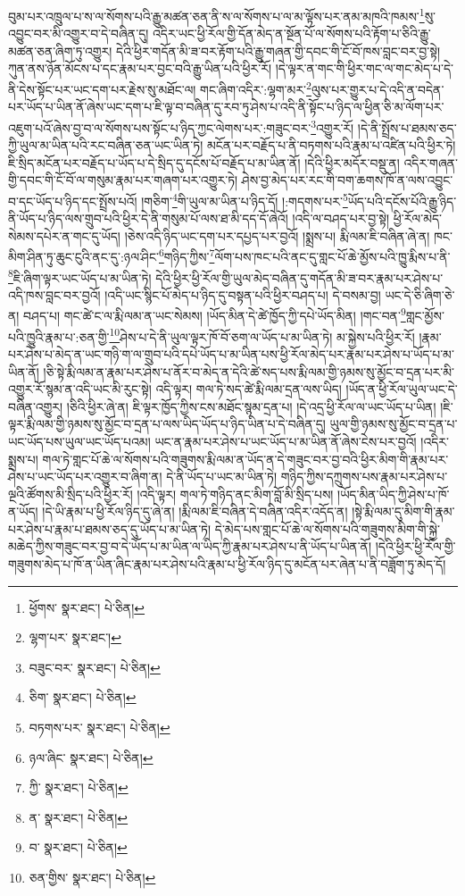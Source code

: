 བུམ་པར་འཁྲུལ་པ་ས་ལ་སོགས་པའི་རྒྱུ་མཚན་ཅན་ནི་ས་ལ་སོགས་པ་ལ་མ་ལྟོས་པར་ནམ་མཁའི་ཁམས་\footnote{ཕྱོགས་  སྣར་ཐང་།  པེ་ཅིན། }སུ་འབྱུང་བར་མི་འགྱུར་བ་དེ་བཞིན་དུ། འདིར་ཡང་ཕྱི་རོལ་གྱི་དོན་མེད་ན་སྔོན་པོ་ལ་སོགས་པའི་རྟོག་པ་ཅིའི་རྒྱུ་མཚན་ཅན་ཞིག་ཏུ་འགྱུར། དེའི་ཕྱིར་གདོན་མི་ཟ་བར་རྟོག་པའི་རྒྱུ་གཞན་གྱི་དབང་གི་ངོ་བོ་ཁས་བླང་བར་བྱ་སྟེ། ཀུན་ནས་ཉོན་མོངས་པ་དང་རྣམ་པར་བྱང་བའི་རྒྱུ་ཡིན་པའི་ཕྱིར་རོ། །དེ་ལྟར་ན་གང་གི་ཕྱིར་གང་ལ་གང་མེད་པ་དེ་ནི་དེས་སྟོང་པར་ཡང་དག་པར་རྗེས་སུ་མཐོང་ལ། གང་ཞིག་འདིར་:ལྷག་མར་\footnote{ལྷག་པར་  སྣར་ཐང་། }ལུས་པར་གྱུར་པ་དེ་འདི་ན་བདེན་པར་ཡོད་པ་ཡིན་ནོ་ཞེས་ཡང་དག་པ་ཇི་ལྟ་བ་བཞིན་དུ་རབ་ཏུ་ཤེས་པ་འདི་ནི་སྟོང་པ་ཉིད་ལ་ཕྱིན་ཅི་མ་ལོག་པར་འཇུག་པའོ་ཞེས་བྱ་བ་ལ་སོགས་པས་སྟོང་པ་ཉིད་ཀྱང་ལེགས་པར་:གཟུང་བར་\footnote{བཟུང་བར་  སྣར་ཐང་།  པེ་ཅིན། }འགྱུར་རོ། །དེ་ནི་སྤྲོས་པ་ཐམས་ཅད་ཀྱི་ཡུལ་མ་ཡིན་པའི་རང་བཞིན་ཅན་ཡང་ཡིན་ཏེ། མངོན་པར་བརྗོད་པ་ནི་བཏགས་པའི་རྣམ་པ་འཛིན་པའི་ཕྱིར་ཏེ། ཇི་སྲིད་མངོན་པར་བརྗོད་པ་ཡོད་པ་དེ་སྲིད་དུ་དངོས་པོ་བརྗོད་པ་མ་ཡིན་ནོ། །དེའི་ཕྱིར་མདོར་བསྡུ་ན། འདིར་གཞན་གྱི་དབང་གི་ངོ་བོ་ལ་གསུམ་རྣམ་པར་གཞག་པར་འགྱུར་ཏེ། ཤེས་བྱ་མེད་པར་རང་གི་བག་ཆགས་ཁོ་ན་ལས་འབྱུང་བ་དང་ཡོད་པ་ཉིད་དང་སྤྲོས་པའོ། །གཅིག་\footnote{ཅིག་  སྣར་ཐང་།  པེ་ཅིན། }གི་ཡུལ་མ་ཡིན་པ་ཉིད་དོ། །:གདགས་པར་\footnote{བཏགས་པར་  སྣར་ཐང་།  པེ་ཅིན། }ཡོད་པའི་དངོས་པོའི་རྒྱུ་ཉིད་ནི་ཡོད་པ་ཉིད་ལས་གྲུབ་པའི་ཕྱིར་དེ་ནི་གསུམ་པོ་ལས་ཐ་མི་དད་དོ་ཞེའོ། །འདི་ལ་བཤད་པར་བྱ་སྟེ། ཕྱི་རོལ་མེད་སེམས་དཔེར་ན་གང་དུ་ཡོད། །ཅེས་འདི་ཉིད་ཡང་དག་པར་དཔྱད་པར་བྱའོ། །སྨྲས་པ། རྨི་ལམ་ཇི་བཞིན་ཞེ་ན། ཁང་མིག་ཤིན་ཏུ་ཆུང་ངུའི་ནང་དུ་:ཉལ་ཤིང་\footnote{ཉལ་ཞིང་  སྣར་ཐང་།  པེ་ཅིན། }གཉིད་ཀྱིས་\footnote{ཀྱི་  སྣར་ཐང་།  པེ་ཅིན། }ལོག་པས་ཁང་པའི་ནང་དུ་གླང་པོ་ཆེ་མྱོས་པའི་ཁྱུ་རྨིས་པ་ནི་\footnote{ན་  སྣར་ཐང་།  པེ་ཅིན། }ཇི་ཞིག་ལྟར་ཡང་ཡོད་པ་མ་ཡིན་ཏེ། དེའི་ཕྱིར་ཕྱི་རོལ་གྱི་ཡུལ་མེད་བཞིན་དུ་གདོན་མི་ཟ་བར་རྣམ་པར་ཤེས་པ་འདི་ཁས་བླང་བར་བྱའོ། །འདི་ཡང་སྙིང་པོ་མེད་པ་ཉིད་དུ་བསྟན་པའི་ཕྱིར་བཤད་པ། དེ་བསམ་བྱ། ཡང་དེ་ཅི་ཞིག་ཅེ་ན། བཤད་པ། གང་ཚེ་ང་ལ་རྨི་ལམ་ན་ཡང་སེམས། །ཡོད་མིན་དེ་ཚེ་ཁྱོད་ཀྱི་དཔེ་ཡོད་མིན། །གང་བན་\footnote{བ་  སྣར་ཐང་།  པེ་ཅིན། }གླང་མྱོས་པའི་ཁྱུའི་རྣམ་པ་:ཅན་གྱི་\footnote{ཅན་གྱིས་  སྣར་ཐང་།  པེ་ཅིན། }ཤེས་པ་དེ་ནི་ཡུལ་ལྟར་ཁོ་བོ་ཅག་ལ་ཡོད་པ་མ་ཡིན་ཏེ། མ་སྐྱེས་པའི་ཕྱིར་རོ། །རྣམ་པར་ཤེས་པ་མེད་ན་ཡང་གཉི་ག་ལ་གྲུབ་པའི་དཔེ་ཡོད་པ་མ་ཡིན་པས་ཕྱི་རོལ་མེད་པར་རྣམ་པར་ཤེས་པ་ཡོད་པ་མ་ཡིན་ནོ། །ཅི་སྟེ་རྨི་ལམ་ན་རྣམ་པར་ཤེས་པ་ནོར་བ་མེད་ན་དེའི་ཚེ་སད་པས་རྨི་ལམ་གྱི་ཉམས་སུ་མྱོང་བ་དྲན་པར་མི་འགྱུར་རོ་སྙམ་ན་འདི་ཡང་མི་རུང་སྟེ། འདི་ལྟར། གལ་ཏེ་སད་ཚེ་རྨི་ལམ་དྲན་ལས་ཡིད། །ཡོད་ན་ཕྱི་རོལ་ཡུལ་ཡང་དེ་བཞིན་འགྱུར། །ཅིའི་ཕྱིར་ཞེ་ན། ཇི་ལྟར་ཁྱོད་ཀྱིས་ངས་མཐོང་སྙམ་དྲན་པ། །དེ་འདྲ་ཕྱི་རོལ་ལ་ཡང་ཡོད་པ་ཡིན། །ཇི་ལྟར་རྨི་ལམ་གྱི་ཉམས་སུ་མྱོང་བ་དྲན་པ་ལས་ཡིད་ཡོད་པ་ཉིད་ཡིན་པ་དེ་བཞིན་དུ། ཡུལ་གྱི་ཉམས་སུ་མྱོང་བ་དྲན་པ་ཡང་ཡོད་པས་ཡུལ་ཡང་ཡོད་པའམ། ཡང་ན་རྣམ་པར་ཤེས་པ་ཡང་ཡོད་པ་མ་ཡིན་ནོ་ཞེས་ངེས་པར་བྱའོ། །འདིར་སྨྲས་པ། གལ་ཏེ་གླང་པོ་ཆེ་ལ་སོགས་པའི་གཟུགས་རྨི་ལམ་ན་ཡོད་ན་དེ་གཟུང་བར་བྱ་བའི་ཕྱིར་མིག་གི་རྣམ་པར་ཤེས་པ་ཡང་ཡོད་པར་འགྱུར་བ་ཞིག་ན། དེ་ནི་ཡོད་པ་ཡང་མ་ཡིན་ཏེ། གཉིད་ཀྱིས་དཀྲུགས་པས་རྣམ་པར་ཤེས་པ་ལྔའི་ཚོགས་མི་སྲིད་པའི་ཕྱིར་རོ། །འདི་ལྟར། གལ་ཏེ་གཉིད་ནང་མིག་བློ་མི་སྲིད་པས། །ཡོད་མིན་ཡིད་ཀྱི་ཤེས་པ་ཁོ་ན་ཡོད། །དེ་ཡི་རྣམ་པ་ཕྱི་རོལ་ཉིད་དུ་ཞེ་ན། །རྨི་ལམ་ཇི་བཞིན་དེ་བཞིན་འདིར་འདོད་ན། །སྟེ་རྨི་ལམ་དུ་མིག་གི་རྣམ་པར་ཤེས་པ་རྣམ་པ་ཐམས་ཅད་དུ་ཡོད་པ་མ་ཡིན་ཏེ། དེ་མེད་པས་གླང་པོ་ཆེ་ལ་སོགས་པའི་གཟུགས་མིག་གི་སྐྱེ་མཆེད་ཀྱིས་གཟུང་བར་བྱ་བ་དེ་ཡོད་པ་མ་ཡིན་ལ་ཡིད་ཀྱི་རྣམ་པར་ཤེས་པ་ནི་ཡོད་པ་ཡིན་ནོ། །དེའི་ཕྱིར་ཕྱི་རོལ་གྱི་གཟུགས་མེད་པ་ཁོ་ན་ཡིན་ཞིང་རྣམ་པར་ཤེས་པའི་རྣམ་པ་ཕྱི་རོལ་ཉིད་དུ་མངོན་པར་ཞེན་པ་ནི་བཟློག་ཏུ་མེད་དོ། 